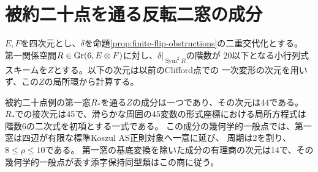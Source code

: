 \section{被約二十点を通る反転二窓の成分}
\label{sec:reversible-component}
$E,F$を四次元とし、$\delta$を命題\ref{prop:finite-flip-obstructions}の二重交代化とする。
第一関係空間$R\in\operatorname{Gr}(6,E\otimes F)$に対し、$\delta|_{\operatorname{Sym}^2R}$の階数が
20以下となる小行列式スキームを$Z$とする。以下の次元は以前のClifford点での
一次変形の次元を用いず、この$Z$の局所環から計算する。

\begin{theorem}[反転二窓の成分と幾何学的一般点]\label{thm:reversible-component}
被約二十点例の第一窓$R_*$を通る$Z$の成分は一つであり、その次元は44である。
$R_*$での接次元は45で、滑らかな周囲の45変数の形式座標における局所方程式は
階数6の二次式を初項とする一式である。
この成分の幾何学的一般点では、第一窓は四辺が有限な標準Koszul AS正則対象へ一意に延び、
周期は2を割り、$8\le\rho\le10$である。
第一窓の基底変換を除いた成分の有理商の次元は14で、その幾何学的一般点が表す添字保持同型類はこの商に従う。
\end{theorem}
